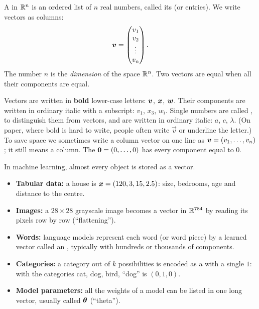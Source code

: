 \begin{definition}[Vector]\label{def:vector}
A  in $\mathbb{R}^n$ is an ordered list of $n$ real numbers, called its
 (or entries). We write vectors as
columns:
\[
  \bm{v} = \begin{pmatrix} v_1 \\ v_2 \\ \vdots \\ v_n \end{pmatrix}.
\]
The number $n$ is the \emph{dimension} of the space $\mathbb{R}^n$. Two vectors are
equal when all their components are equal.
\end{definition}

\begin{notation}
Vectors are written in \textbf{bold} lower-case letters: $\bm{v}$, $\bm{x}$, $\bm{w}$.
Their components are written in ordinary italic with a subscript: $v_1$,
$x_3$, $w_i$. Single numbers are called , to distinguish
them from vectors, and are written in ordinary italic: $a$, $c$, $\lambda$.
(On paper, where bold is hard to write, people often write $\vec v$ or
underline the letter.) To save space we sometimes write a column vector on one
line as $\bm{v} = (v_1, \dots, v_n)$; it still means a column. The
 $\bm{0} = (0, \dots, 0)$ has every component equal to $0$.
\end{notation}

\begin{mlnote}
In machine learning, almost every object is stored as a vector.
\begin{itemize}
  \item \textbf{Tabular data:} a house is $\bm{x} = (120, 3, 15, 2.5)$: size,
    bedrooms, age and distance to the centre.
  \item \textbf{Images:} a $28\times28$ grayscale image becomes a vector in
    $\mathbb{R}^{784}$ by reading its pixels row by row (``flattening'').
  \item \textbf{Words:} language models represent each word (or word piece) by
    a learned vector called an , typically with hundreds or
    thousands of components.
  \item \textbf{Categories:} a category out of $k$ possibilities is encoded as a
     with a single $1$: with the categories cat, dog,
    bird, ``dog'' is $(0, 1, 0)$.
  \item \textbf{Model parameters:} all the weights of a model can be listed in
    one long vector, usually called $\bm{\theta}$ (``theta'').
\end{itemize}
\end{mlnote}

